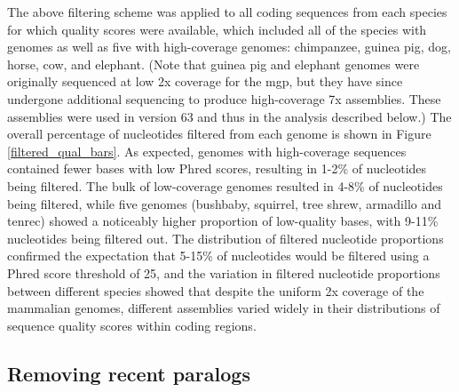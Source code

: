 The above filtering scheme was applied to all coding sequences from
each species for which quality scores were available, which included
all of the species with \lcv genomes as well as five with
high-coverage genomes: chimpanzee, guinea pig, dog, horse, cow, and
elephant. (Note that guinea pig and elephant genomes were originally
sequenced at low 2x coverage for the \ac{mgp}, but they have since
undergone additional sequencing to produce high-coverage 7x
assemblies. These assemblies were used in \ens version 63 and thus in
the analysis described below.) The overall percentage of nucleotides
filtered from each genome is shown in Figure
\ref{filtered_qual_bars}. As expected, genomes with high-coverage
sequences contained fewer bases with low Phred scores, resulting in
1-2\% of nucleotides being filtered. The bulk of low-coverage genomes
resulted in 4-8\% of nucleotides being filtered, while five genomes
(bushbaby, squirrel, tree shrew, armadillo and tenrec) showed a
noticeably higher proportion of low-quality bases, with 9-11\%
nucleotides being filtered out. The distribution of filtered
nucleotide proportions confirmed the expectation that 5-15\% of
nucleotides would be filtered using a Phred score threshold of 25, and
the variation in filtered nucleotide proportions between different
species showed that despite the uniform 2x coverage of the \lcv
mammalian genomes, different assemblies varied widely in their
distributions of sequence quality scores within coding regions.

\subsection{Removing recent paralogs}
\label{sec_removing_paralogs}

